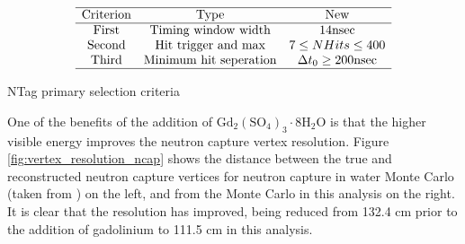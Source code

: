\begin{table}
    $$
    \begin{array}{ccc}
    \hline \text{Criterion} & \text{Type} & \text{New} \\
    \hline \text { First } & \text{Timing window width} & 14 \mathrm{nsec} \\
    \text { Second } & \text{Hit trigger and max} & 7 \leq NH i t s \leq 400 \\
    \text { Third } & \text{Minimum hit seperation} & \Delta t_0 \geq 200 \mathrm{nsec}\\
    \hline
    \end{array}
    $$
    \caption{NTag primary selection criteria}
    \label{table:new_selection_criteria}
\end{table}

 One of the benefits of the addition of $\mathrm{Gd}_{2}\left(\mathrm{SO}_{4}\right)_{3} \cdot 8 \mathrm{H}_{2} \mathrm{O}$ is that the higher visible energy improves the neutron capture vertex resolution. Figure \ref{fig:vertex_resolution_ncap} shows the distance between the true and reconstructed neutron capture vertices for neutron capture in water Monte Carlo (taken from \cite{akutsu_thesis}) on the left, and from the Monte Carlo in this analysis on the right. It is clear that the resolution has improved, being reduced from 132.4 cm prior to the addition of gadolinium to 111.5 cm in this analysis.

